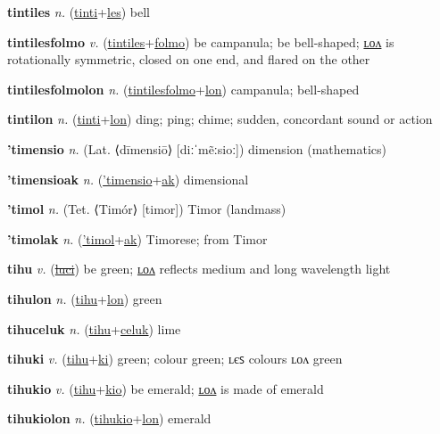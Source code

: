\textbf{\hypertarget{tintiles}{tintiles}} \textit{n.} (\hyperlink{tinti}{tinti}+\allowbreak \hyperlink{les}{les})
bell

\textbf{\hypertarget{tintilesfolmo}{tintilesfolmo}} \textit{v.} (\hyperlink{tintiles}{tintiles}+\allowbreak \hyperlink{folmo}{folmo})
be campanula; be bell-shaped; \hyperlink{tintilesfolmolon}{ʟᴏᴧ} is rotationally symmetric, closed on one end, and flared on the other

\textbf{\hypertarget{tintilesfolmolon}{tintilesfolmolon}} \textit{n.} (\hyperlink{tintilesfolmo}{tintilesfolmo}+\allowbreak \hyperlink{lon}{lon})
campanula; bell-shaped

\textbf{\hypertarget{tintilon}{tintilon}} \textit{n.} (\hyperlink{tinti}{tinti}+\allowbreak \hyperlink{lon}{lon})
ding; ping; chime; sudden, concordant sound or action

\textbf{\hypertarget{'timensio}{'timensio}} \textit{n.} (Lat. ⟨dīmensiō⟩ [diːˈmẽːsioː])
dimension (mathematics)

\textbf{\hypertarget{'timensioak}{'timensioak}} \textit{n.} (\hyperlink{'timensio}{'timensio}+\allowbreak \hyperlink{ak}{ak})
dimensional

\textbf{\hypertarget{'timol}{'timol}} \textit{n.} (Tet. ⟨Timór⟩ [timor])
Timor (landmass)

\textbf{\hypertarget{'timolak}{'timolak}} \textit{n.} (\hyperlink{'timol}{'timol}+\allowbreak \hyperlink{ak}{ak})
Timorese; from Timor

\textbf{\hypertarget{tihu}{tihu}} \textit{v.} (\hyperlink{luci}{\sout{luci}})
be green; \hyperlink{tihulon}{ʟᴏᴧ} reflects medium and long wavelength light

\textbf{\hypertarget{tihulon}{tihulon}} \textit{n.} (\hyperlink{tihu}{tihu}+\allowbreak \hyperlink{lon}{lon})
green

\textbf{\hypertarget{tihuceluk}{tihuceluk}} \textit{n.} (\hyperlink{tihu}{tihu}+\allowbreak \hyperlink{celuk}{celuk})
lime

\textbf{\hypertarget{tihuki}{tihuki}} \textit{v.} (\hyperlink{tihu}{tihu}+\allowbreak \hyperlink{ki}{ki})
green; colour green; ʟєꜱ colours ʟᴏᴧ green

\textbf{\hypertarget{tihukio}{tihukio}} \textit{v.} (\hyperlink{tihu}{tihu}+\allowbreak \hyperlink{kio}{kio})
be emerald; \hyperlink{tihukiolon}{ʟᴏᴧ} is made of emerald

\textbf{\hypertarget{tihukiolon}{tihukiolon}} \textit{n.} (\hyperlink{tihukio}{tihukio}+\allowbreak \hyperlink{lon}{lon})
emerald

